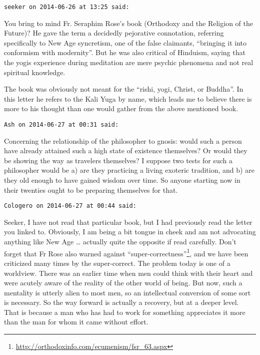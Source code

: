 \begin{footnotesize}\begin{sffamily}

\texttt{seeker on 2014-06-26 at 13:25 said: }

You bring to mind Fr. Seraphim Rose's book (Orthodoxy and the Religion of the Future)? He gave the term a
decidedly pejorative connotation, referring specifically to New Age syncretism, one of the false claimants, “bringing
it into conformism with modernity”. But he was also critical of Hinduism, saying that the yogis experience during
meditation are mere psychic phenomena and not real spiritual knowledge.

The book was obviously not meant for the “rishi, yogi, Christ, or Buddha”. In this letter he refers to the Kali Yuga by
name, which leads me to believe there is more to his thought than one would gather from the above mentioned book. 

\hfill

\texttt{Ash on 2014-06-27 at 00:31 said: }

Concerning the relationship of the philosopher to gnosis: would such a person have already attained such a high state of
existence themselves? Or would they be showing the way as travelers themselves? I suppose two tests for such a
philosopher would be a) are they practicing a living exoteric tradition, and b) are they old enough to have gained
wisdom over time. So anyone starting now in their twenties ought to be preparing themselves for that.

\hfill

\texttt{Cologero on 2014-06-27 at 00:44 said: }

Seeker, I have not read that particular book, but I had previously read the letter you linked to. Obviously, I am being
a bit tongue in cheek and am not advocating anything like New Age … actually quite the opposite if read carefully.
Don't forget that Fr Rose also warned against “super-correctness”\footnote{\url{http://orthodoxinfo.com/ecumenism/fsr_63.aspx}}, and we have been criticized many times
by the super-correct. The problem today is one of a worldview. There was an earlier time when men could think with
their heart and were acutely aware of the reality of the other world of being. But now, such a mentality is utterly
alien to most men, so an intellectual conversion of some sort is necessary. So the way forward is actually a recovery,
but at a deeper level. That is because a man who has had to work for something appreciates it more than the man for
whom it came without effort.


\end{sffamily}
\end{footnotesize}
